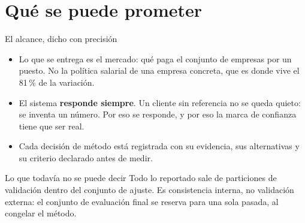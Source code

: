 \documentclass[11pt]{beamer}
\begin{document}
\section{Qué se puede prometer}

\begin{frame}{El alcance, dicho con precisión}
\begin{itemize}
\item Lo que se entrega es el \alert{mercado}: qué paga el conjunto de empresas
por un puesto. No la política salarial de una empresa concreta, que es donde
vive el 81\,\% de la variación.
\item El sistema \textbf{responde siempre}. Un cliente sin referencia no se
queda quieto: se inventa un número. Por eso se responde, y por eso la marca de
confianza tiene que ser real.
\item Cada decisión de método está registrada con su evidencia, sus
alternativas y su criterio declarado antes de medir.
\end{itemize}
\vspace{1em}
\begin{block}{Lo que todavía no se puede decir}
Todo lo reportado sale de particiones de validación dentro del conjunto de
ajuste. Es consistencia interna, no validación externa: el conjunto de
evaluación final se reserva para una sola pasada, al congelar el método.
\end{block}
\end{frame}
\end{document}
